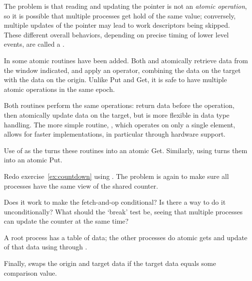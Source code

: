The problem is that reading and updating the pointer is not an
\emph{atomic operation}, so
it is possible that multiple processes get hold of the same value;
conversely, multiple updates of the pointer may lead to work
descriptors being skipped.
These different overall behaviors, depending on precise timing of lower level events,
are called a .

In  some atomic routines have been added.
Both  and 
atomically retrieve data from the window indicated,
and apply an operator, combining the data on the target
with the data on the origin.
Unlike Put and Get, it is safe to have multiple atomic operations
in the same epoch.

Both routines perform the same operations: return data before the
operation, then atomically update data on the target, but
 is more flexible in data type
handling. The more simple routine, ,
which operates on only a single element,
allows for faster implementations, in particular through hardware support.

Use of  as the 
turns these routines into an atomic Get. Similarly, using
 turns them into an atomic Put.

\begin{exercise}
  \label{ex:countdownop}
  Redo exercise~\ref{ex:countdown} using . The
  problem is again to make sure all processes have the same view of
  the shared counter.

  Does it work to make the fetch-and-op conditional? Is there a way to
  do it unconditionally? What should the `break' test be, seeing that
  multiple processes can update the counter at the same time?
\end{exercise}

\begin{example}
  A root process has a table of data; the other processes do 
  atomic gets and update of that data using
   through .
\end{example}

Finally,  swaps the origin and
target data if the target data equals some comparison value.

